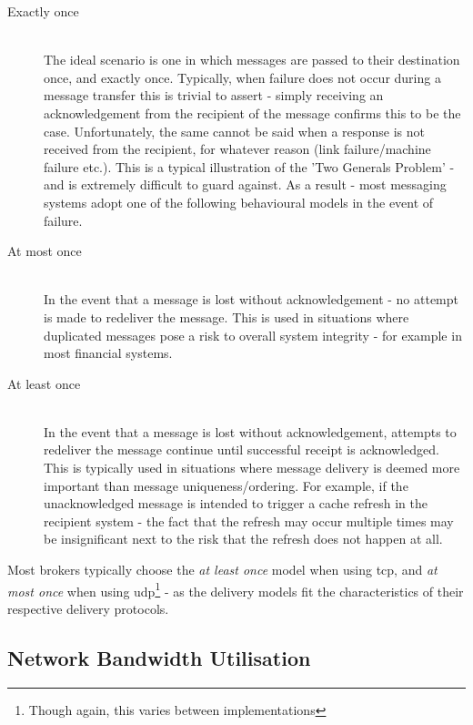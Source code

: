 \begin{description}
  \item[Exactly once] \hfill \\
    The ideal scenario is one in which messages are passed to their destination
    once, and exactly once. Typically, when failure does not occur during a
    message transfer this is trivial to assert - simply receiving an
    acknowledgement from the recipient of the message confirms this to be the
    case. Unfortunately, the same cannot be said when a response is not received
    from the recipient, for whatever reason (link failure/machine failure etc.).
    This is a typical illustration of the 'Two Generals
    Problem'\cite{Gray:1978:NDB:647433.723863} - and is extremely difficult to
    guard against. As a result - most messaging systems adopt one of the
    following behavioural models in the event of failure.
  \item[At most once] \hfill \\
    In the event that a message is lost without acknowledgement - no attempt is
    made to redeliver the message. This is used in situations where duplicated
    messages pose a risk to overall system integrity - for example in most
    financial systems.
  \item[At least once] \hfill \\
    In the event that a message is lost without acknowledgement, attempts to
    redeliver the message continue until successful receipt is acknowledged.
    This is typically used in situations where message delivery is deemed more
    important than message uniqueness/ordering. For example, if the
    unacknowledged message is intended to trigger a cache refresh in the
    recipient system - the fact that the refresh may occur multiple times may be
    insignificant next to the risk that the refresh does not happen at all.
\end{description}

Most brokers typically choose the \textit{at least once} model when using
\gls{tcp}, and \textit{at most once} when using \gls{udp}\footnote{Though again,
this varies between implementations} - as the delivery models fit the
characteristics of their respective delivery protocols.

\subsection{Network Bandwidth Utilisation}
\label{sub:Network Bandwidth Utilization}

